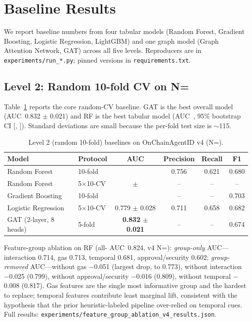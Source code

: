 \documentclass[10pt]{article}
\begin{document}
\section{Baseline Results}
\label{sec:baselines}

We report baseline numbers from four tabular models (Random Forest, Gradient Boosting, Logistic Regression, LightGBM) and one graph model (Graph Attention Network, GAT) across all five levels. Reproducers are in \texttt{experiments/run\_*.py}; pinned versions in \texttt{requirements.txt}.

\subsection{Level 2: Random 10-fold CV on N=\datasetNAddresses{}}

Table~\ref{tab:level2} reports the core random-CV baseline. GAT is the best overall model (AUC~0.832 $\pm$ 0.021) and RF is the best tabular model (AUC~\randomCvRfAuc{}, 95\% bootstrap CI [\bootstrapLevelRfAucCiLo{}, \bootstrapLevelRfAucCiHi{}]). Standard deviations are small because the per-fold test size is $\sim$115.

\begin{table}[h]
\centering
\small
\caption{Level 2 (random 10-fold) baselines on OnChainAgentID v4 (N=\datasetNAddresses{}).}
\label{tab:level2}
\begin{tabular}{llcccc}
\toprule
Model & Protocol & AUC & Precision & Recall & F1 \\
\midrule
Random Forest & 10-fold & \randomCvRfAuc{} & 0.756 & 0.621 & 0.680 \\
Random Forest & 5$\times$10-CV & \randomCvRfAuc{} $\pm$ \randomCvRfAucStd{} & -- & -- & -- \\
Gradient Boosting & 10-fold & \randomCvGbmAuc{} & -- & -- & 0.703 \\
Logistic Regression & 5$\times$10-CV & 0.779 $\pm$ 0.028 & 0.711 & 0.658 & 0.682 \\
GAT (2-layer, 8 heads) & 5-fold & \textbf{0.832 $\pm$ 0.021} & -- & -- & 0.674 \\
\bottomrule
\end{tabular}
\end{table}

Feature-group ablation on RF (all-\datasetNFeatures{} AUC~0.824, v4 N=\datasetNAddresses{}): \emph{group-only} AUC---interaction 0.714, gas 0.713, temporal 0.681, approval/security 0.602; \emph{group-removed} AUC---without gas $-$0.051 (largest drop, to 0.773), without interaction $-$0.025 (0.799), without approval/security $-$0.016 (0.809), without temporal $-$0.008 (0.817). Gas features are the single most informative group and the hardest to replace; temporal features contribute least marginal lift, consistent with the hypothesis that the prior heuristic-labeled pipeline over-relied on temporal cues. Full results: \texttt{experiments/feature\_group\_ablation\_v4\_results.json}.
\end{document}
